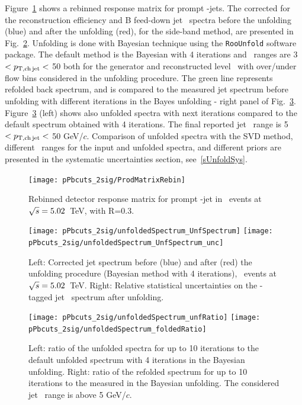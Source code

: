 Figure~\ref{fig:pPb_ResponseMatrix_Dzero} shows a rebinned response matrix for prompt \Dzero-jets.
The corrected for the reconstruction efficiency and B feed-down jet \pt\ spectra before the unfolding (blue) and after the unfolding (red), for the side-band method, are presented in Fig.~\ref{fig:UnfSpec_pPb_Dzero}.
Unfolding is done with Bayesian technique using the \texttt{RooUnfold} software package. The default method is the Bayesian with 4 iterations and \ptchjet\ ranges are 3 $< p_{\mathrm{T,ch\, jet}}< $ 50 both for the generator and reconstructed level \pt\, with over/under flow bins considered in the unfolding procedure.
The green line represents refolded back spectrum, and is compared to the measured jet spectrum before unfolding with different iterations in the Bayes unfolding - right panel of Fig.~\ref{fig:unfIterations_pPb_Dzero}. Figure~\ref{fig:unfIterations_pPb_Dzero} (left) shows also unfolded spectra with next iterations compared to the default spectrum obtained with 4 iterations.
The final reported jet \pt\ range is 5 $< p_{\mathrm{T,ch\, jet}}<$ 50 GeV/$c$.
Comparison of unfolded spectra with the SVD method, different \pt\ ranges for the input and unfolded spectra, and different priors are presented in the systematic uncertainties section, see~\ref{sUnfoldSys}. 

\begin{figure}[bth]
\centering
\texttt{[image: pPbcuts\_2sig/ProdMatrixRebin]}
\caption{Rebinned detector response matrix for prompt \Dzero-jet in \pp\ events at $\sqrt{s}=5.02$~TeV, with R=0.3.}
\label{fig:pPb_ResponseMatrix_Dzero}
\end{figure}

\begin{figure}[bth]
\centering
\texttt{[image: pPbcuts\_2sig/unfoldedSpectrum\_UnfSpectrum]}
\texttt{[image: pPbcuts\_2sig/unfoldedSpectrum\_UnfSpectrum\_unc]}
\caption{Left: Corrected jet \pt spectrum before (blue) and after (red) the unfolding procedure (Bayesian method with 4 iterations), \pp\ events at $\sqrt{s}=5.02$~TeV. Right: Relative statistical uncertainties on the \Dzero-tagged jet \pt\ spectrum after unfolding.}
\label{fig:UnfSpec_pPb_Dzero}
\end{figure}

\begin{figure}[bth]
\centering
\texttt{[image: pPbcuts\_2sig/unfoldedSpectrum\_unfRatio]}
\texttt{[image: pPbcuts\_2sig/unfoldedSpectrum\_foldedRatio]}
\caption{Left: ratio of the unfolded spectra for up to 10 iterations to the default unfolded spectrum with 4 iterations in the Bayesian unfolding. Right: ratio of the refolded spectrum for up to 10 iterations to the measured in the Bayesian unfolding. The considered jet \pt\ range is above 5 GeV/$c$.}
\label{fig:unfIterations_pPb_Dzero}
\end{figure}

